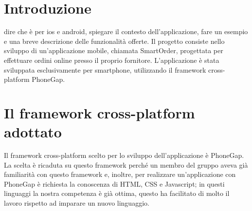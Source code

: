 \documentclass[12pt, a4paper, titlepage]{report}
\begin{document}
	
	\begin{frontespizio}
		\begin{Preambolo*}
			\usepackage{fourier}
		\end{Preambolo*}
	\end{frontespizio}
	
	\setcounter{page}{2}
	\tableofcontents
	\newpage
	\listoffigures
	\newpage	    
	\renewcommand*{\arraystretch}{2}
	\pagestyle{fancy}
	\fancyhf{}
	\cfoot{\thepage}
	
	\section{Introduzione}
	dire che è per ios e android, spiegare il contesto dell'applicazione, fare un esempio e una breve descrizione delle funzionalità offerte.
	Il progetto consiste nello sviluppo di un'applicazione mobile, chiamata SmartOrder, progettata per effettuare ordini online presso il proprio fornitore. L'applicazione è stata sviluppata esclusivamente per smartphone, utilizzando il framework cross-platform PhoneGap.
	
	\section{Il framework cross-platform adottato}
	Il framework cross-platform scelto per lo sviluppo dell'applicazione è PhoneGap. La scelta è ricaduta su questo framework perché un membro del gruppo aveva già familiarità con questo framework e, inoltre, per realizzare un'applicazione con PhoneGap è richiesta la conoscenza di HTML, CSS e Javascript; in questi linguaggi la nostra competenza è già ottima, questo ha facilitato di molto il lavoro rispetto ad imparare un nuovo linguaggio.
	
\end{document}
